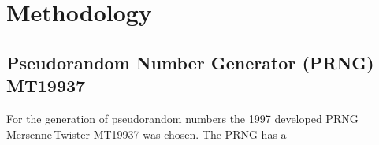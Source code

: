 \section{Methodology}

\subsection{Pseudorandom Number Generator (PRNG) MT19937}\label{ssec:methodology_rng_mt19937}

For the generation of pseudorandom numbers the 1997 developed PRNG Mer\-sen\-ne\,Twis\-ter MT19937 was chosen.\cite{educativeMersenneTwister}\cite{Makoto_Takuji} The PRNG has a
